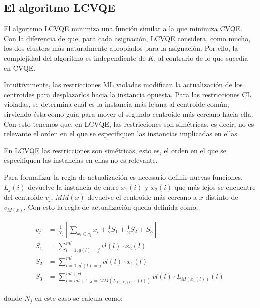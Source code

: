 \subsection{El algoritmo LCVQE}

El algoritmo \acs{LCVQE} minimiza una función similar a la que minimiza \acs{CVQE}. Con la diferencia de que, para cada asignación, \acs{LCVQE} considera, como mucho, los dos clusters más naturalmente apropiados para la asignación. Por ello, la complejidad del algoritmo es independiente de $K$, al contrario de lo que sucedía en \acs{CVQE}.

Intuitivamente, las restricciones \acs{ML} violadas modifican la actualización de los centroides para desplazarlos hacia la instancia opuesta. Para las restricciones \acs{CL} violadas, se determina cuál es la instancia más lejana al centroide común, sirviendo ésta como guía para mover el segundo centroide más cercano hacia ella. Con esto tenemos que, en \acs{LCVQE}, las restricciones son simétricas, es decir, no es relevante el orden en el que se especifiquen las instancias implicadas en ellas.

\begin{observacion}
	
	En \acs{LCVQE} las restricciones son simétricas, esto es, el orden en el que se especifiquen las instancias en ellas no es relevante.
	
\end{observacion}

Para formalizar la regla de actualización es necesario definir nuevas funciones. $L_j(i)$ devuelve la instancia de entre $x_1(i)$ y $x_2(i)$ que más lejos se encuentre del centroide $v_j$. $MM(x)$ devuelve el centroide más cercano a $x$ distinto de $v_{M(x)}$. Con esto la regla de actualización queda definida como:

\begin{equation}
\begin{split}
v_j &= \frac{1}{N_j} \left[ \sum_{x_i \in c_j} x_i + 
\frac{1}{2} S_1 + \frac{1}{2} S_2 + S_3 \right]\\
S_1 &= \sum_{l=1,g(l) = j}^{ml} vl(l) \cdot x_2(l) \\
S_2 &= \sum_{l=1,g^\prime(l) = j}^{ml} vl(l) \cdot x_1(l) \\
S_3 &= \sum_{l=ml+1, j = MM(L_{M(x_1(l))}(l))}^{ml + cl} vl(l) \cdot L_{M(x_1(l))}(l)
\end{split}
\label{eqn38}
\end{equation}

donde $N_j$ en este caso se calcula como:

